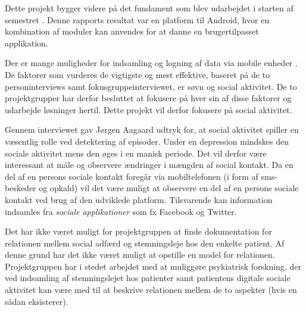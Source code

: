 Dette projekt bygger videre på det fundament som blev udarbejdet i starten af semestret \citefaelles{}.
Denne rapports resultat var en platform til Android, hvor en kombination af moduler kan anvendes for at danne en brugertilpasset applikation.

Der er mange muligheder  for indsamling og logning af data via mobile enheder .
De faktorer som vurderes de vigtigste og mest effektive, baseret på de to personinterviews samt fokusgruppeinterviewet, er søvn og social aktivitet.
De to projektgrupper har derfor besluttet at fokusere på hver sin af disse faktorer og udarbejde løsninger hertil.
Dette projekt vil derfor fokusere på social aktivitet.

Gennem interviewet  gav Jørgen Aagaard udtryk for, at social aktivitet spiller en væsentlig rolle ved detektering af episoder.
Under en depression mindskes den sociale aktivitet mens den øges i en manisk periode.
Det vil derfor være interessant at måle og observere ændringer i mængden af social kontakt.
Da en del af en persons sociale kontakt foregår via mobiltelefonen (i form af sms-beskeder og opkald) vil det være muligt at observere en del af en persons sociale kontakt ved brug af den udviklede platform.
Tilsvarende kan information indsamles fra \textit{sociale applikationer} som fx Facebook og Twitter.

Det har ikke været muligt for projektgruppen at finde dokumentation for relationen mellem social adfærd og stemningsleje hos den enkelte patient.
Af denne grund har det ikke været muligt at opstille en model for relationen.
Projektgruppen har i stedet arbejdet med at muliggøre psykiatrisk forskning, der ved indsamling af stemningslejet hos patienter samt patientens digitale sociale aktivitet kan være med til at beskrive relationen mellem de to aspekter (hvis en sådan eksisterer).